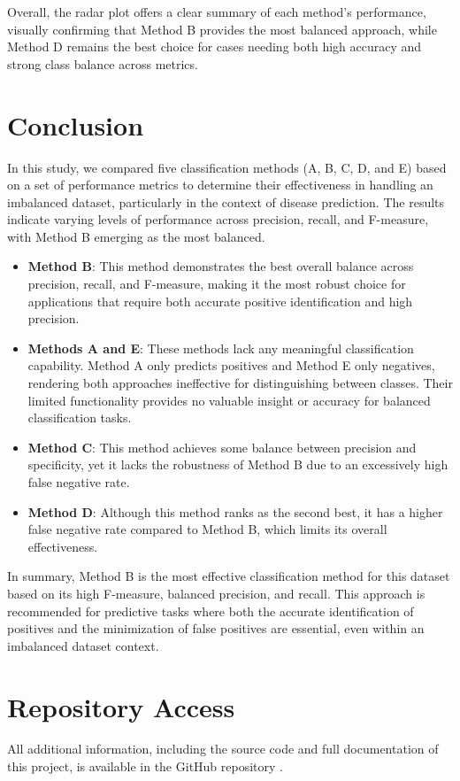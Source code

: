 \documentclass{article}
\begin{document}
Overall, the radar plot offers a clear summary of each method’s performance, visually confirming that Method B provides the most balanced approach, while Method D remains the best choice for cases needing both high accuracy and strong class balance across metrics.
\\



\section{Conclusion}
In this study, we compared five classification methods (A, B, C, D, and E) based on a set of performance metrics to determine their effectiveness in handling an imbalanced dataset, particularly in the context of disease prediction. The results indicate varying levels of performance across precision, recall, and F-measure, with Method B emerging as the most balanced.

\begin{itemize}
	\item \textbf{Method B}: This method demonstrates the best overall balance across precision, recall, and F-measure, making it the most robust choice for applications that require both accurate positive identification and high precision.
	
	\item \textbf{Methods A and E}: These methods lack any meaningful classification capability. Method A only predicts positives and Method E only negatives, rendering both approaches ineffective for distinguishing between classes. Their limited functionality provides no valuable insight or accuracy for balanced classification tasks.
	
	\item \textbf{Method C}: This method achieves some balance between precision and specificity, yet it lacks the robustness of Method B due to an excessively high false negative rate.
	
	\item \textbf{Method D}: Although this method ranks as the second best, it has a higher false negative rate compared to Method B, which limits its overall effectiveness.
\end{itemize}



In summary, Method B is the most effective classification method for this dataset based on its high F-measure, balanced precision, and recall. This approach is recommended for predictive tasks where both the accurate identification of positives and the minimization of false positives are essential, even within an imbalanced dataset context.


\section{Repository Access}

All additional information, including the source code and full documentation of this project, is available in the GitHub repository \cite{cuevas2024github}.


\end{document}

